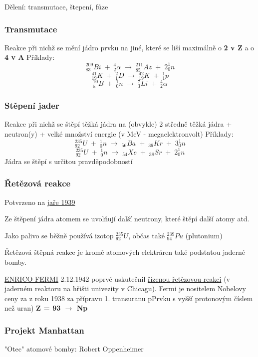 Dělení: transmutace, štepení, fůze

\subsubsection{Transmutace}
Reakce při nichž se mění jádro prvku na jiné, které se liší maximálně o \textbf{2 v Z} a o \textbf{4 v A}
Příklady:
\[^{209}_{83}Bi \; + \; ^4_2\alpha \; \longrightarrow \; ^{211}_{85}Az \; + \; 2^1_0n\]
\vspace{0.2em}
\[^{41}_{19}K \; + \; ^2_1D \; \longrightarrow \; ^{42}_{19}K \; + \; ^1_1p\]
\vspace{0.2em}
\[^{10}_{5}B \; + \; ^1_0n \; \longrightarrow \; ^{7}_{3}Li \; + \; ^4_2\alpha\]

\subsubsection{Stěpení jader}
Reakce při nichž se štěpí těžká jádra na (obvykle) 2 středně těžká jádra + neutron(y) + velké množství energie (v MeV - megaelektronvolt)
Příklady:
\[^{235}_{92}U \; + \; ^1_0n \; \longrightarrow \; _{56}Ba \; + \; _{36}Kr \; + \; 3^1_0n\]
\vspace{0.1em}
\[^{235}_{92}U \; + \; ^1_0n \; \longrightarrow \; _{54}Xe \; + \; _{38}Sr \; + \; 2^1_0n\]
Jádra se štěpí s určitou pravděpodobností

\subsubsection{Řetězová reakce}
Potvrzeno na \underline{jaře 1939}

Ze štěpení jádra atomem se uvolňují další neutrony, které štěpí další atomy atd.

Jako palivo se běžně používá izotop $^{235}_{92}U$, občas také $^{239}_{94}Pu$ (plutonium)

Řetězová štěpná reakce je kromě atomových elektráren také podstatou jaderné bomby.

\vspace{1em}

\underline{ENRICO FERMI} 2.12.1942 poprvé uskutečnil \underline{řízenou řetězovou reakci} (v jaderném reaktoru na hřišti univezity v Chicagu).
Fermi je nositelem Nobelovy ceny za z roku 1938 za přípravu 1. transuranu pPrvku s vyšší protonovým číslem než uran) \textbf{Z = 93 $\rightarrow$ Np}

\subsubsection{Projekt Manhattan}
"Otec" atomové bomby: Robert Oppenheimer

